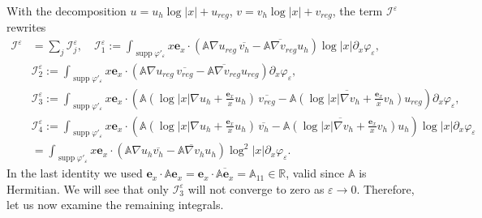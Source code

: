 \documentclass[report]{elsarticle}
\numberwithin{theorem}{section}
\newcommand{\re}{\varepsilon}
\begin{document}
	With the decomposition $u=u_h\log|x|+u_{reg}$, $v=v_h\log|x|+v_{reg}$, the term $\mathcal{I}^{\varepsilon}$ rewrites
	\begin{align*}
		\mathcal{I}^{\varepsilon}&=\sum\limits_{j}\mathcal{I}_j^{\varepsilon}, \quad \mathcal{I}^{\varepsilon}_1:=\int_{\operatorname{supp}\varphi'_{\varepsilon}} x \mathbf{e}_x\cdot\left(\mathbb{A}\nabla u_{reg}\, \overline{v_h}-\overline{\mathbb{A}\nabla v_{reg}}{u_h}\right)\log|x|\partial_{x}\varphi_{\varepsilon},\\
		&\mathcal{I}^{\varepsilon}_2:=\int_{\operatorname{supp}\varphi'_{\varepsilon}} x \mathbf{e}_x\cdot\left(\mathbb{A}\nabla u_{reg}\, \overline{v_{reg}}-\overline{\mathbb{A}\nabla v_{reg}}{u_{reg}}\right)\partial_{x}\varphi_{\varepsilon},\\
		&\mathcal{I}^{\varepsilon}_3:=\int_{\operatorname{supp}\varphi'_{\varepsilon}} x \mathbf{e}_x\cdot\left(\mathbb{A}(\log|x|\nabla u_h+\frac{\mathbf{e}_x}{x}u_h)\, \overline{v_{reg}}-\overline{\mathbb{A}(\log|x|\nabla v_h+\frac{\mathbf{e}_x}{x}v_h)}{u_{reg}}\right)\partial_{x}\varphi_{\varepsilon},\\
		&\mathcal{I}^{\varepsilon}_4:=\int_{\operatorname{supp}\varphi'_{\varepsilon}} x \mathbf{e}_x\cdot\left(\mathbb{A}(\log|x|\nabla u_h+\frac{\mathbf{e}_x}{x}u_h)\, \overline{v_{h}}-\overline{\mathbb{A}(\log|x|\nabla v_h+\frac{\mathbf{e}_x}{x}v_h)}{u_{h}}\right)\log|x|\partial_{x}\varphi_{\varepsilon}\\
		&=\int_{\operatorname{supp}\varphi'_{\varepsilon}} x \mathbf{e}_x\cdot\left(\mathbb{A}\nabla u_h \overline{v_{h}}-\overline{\mathbb{A}\nabla v_h}u_h\right)\log^2|x|\partial_{x}\varphi_{\varepsilon}.
	\end{align*}
	In the last identity we used $\mathbf{e}_x\cdot\mathbb{A}\mathbf{e}_x=\mathbf{e}_x\cdot\overline{\mathbb{A}\mathbf{e}_x}=\mathbb{A}_{11}\in \mathbb{R}$, valid since $\mathbb{A}$ is Hermitian. We will see that only $\mathcal{I}^{\re}_3$ will not converge to zero as $\re\rightarrow 0$. Therefore, let us now examine the remaining integrals. 
	
\end{document}
